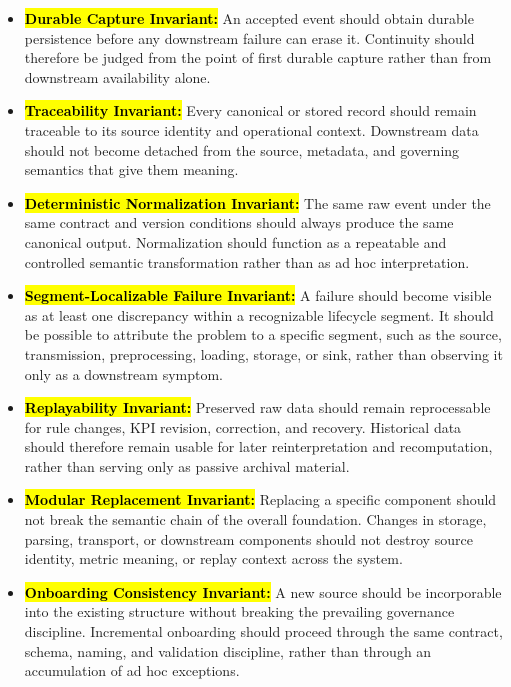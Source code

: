 \documentclass[systems,article,accept,pdftex,moreauthors]{Definitions/mdpi}
\begin{document}
\begin{itemize}
    \item[\textbf{\hl{I1.}}] \textbf{\hl{Durable Capture Invariant:}} An accepted event should obtain durable persistence before any downstream failure can erase it. Continuity should therefore be judged from the point of first durable capture rather than from downstream availability alone.

    \item[\textbf{\hl{I2.}}] \textbf{\hl{Traceability Invariant:}} Every canonical or stored record should remain traceable to its source identity and operational context. Downstream data should not become detached from the source, metadata, and governing semantics that give them meaning.

    \item[\textbf{\hl{I3.}}] \textbf{\hl{Deterministic Normalization Invariant:}} The same raw event under the same contract and version conditions should always produce the same canonical output. Normalization should function as a repeatable and controlled semantic transformation rather than as ad hoc interpretation.

    \item[\textbf{\hl{I4.}}] \textbf{\hl{Segment-Localizable Failure Invariant:}} A failure should become visible as at least one discrepancy within a recognizable lifecycle segment. It should be possible to attribute the problem to a specific segment, such as the source, transmission, preprocessing, loading, storage, or sink, rather than observing it only as a downstream symptom.

    \item[\textbf{\hl{I5.}}] \textbf{\hl{Replayability Invariant:}} Preserved raw data should remain reprocessable for rule changes, KPI revision, correction, and recovery. Historical data should therefore remain usable for later reinterpretation and recomputation, rather than serving only as passive archival material.

    \item[\textbf{\hl{I6.}}] \textbf{\hl{Modular Replacement Invariant:}} Replacing a specific component should not break the semantic chain of the overall foundation. Changes in storage, parsing, transport, or downstream components should not destroy source identity, metric meaning, or replay context across the system.

    \item[\textbf{\hl{I7.}}] \textbf{\hl{Onboarding Consistency Invariant:}} A new source should be incorporable into the existing structure without breaking the prevailing governance discipline. Incremental onboarding should proceed through the same contract, schema, naming, and validation discipline, rather than through an accumulation of ad hoc exceptions.
\end{itemize}
\end{document}
